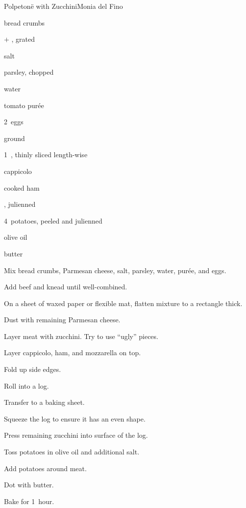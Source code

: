 \begin{recipe}{Polpeton\"e with Zucchini}{Monia del Fino}{}

\begin{ingredients}
\item {} bread crumbs
\item {}$+$ , grated
\item {} salt
\item {} parsley, chopped
\item {} water
\item {} tomato pur\'ee
\item 2~eggs
\item {} ground 
\item 1\half{}~, thinly sliced length-wise
\item cappicolo
\item cooked ham
\item {}, julienned
\item 4~potatoes, peeled and julienned
\item olive oil
\item butter
\end{ingredients}

\begin{directions}
\item Mix bread crumbs,  Parmesan cheese, salt, parsley, water, pur\'ee, and eggs.
\item Add beef and knead until well-combined.
\item On a sheet of waxed paper or flexible mat, flatten mixture to a rectangle \inch{\quarter} thick.
\item Dust with remaining Parmesan cheese.
\item Layer meat with zucchini. Try to use ``ugly'' pieces.
\item Layer cappicolo, ham, and mozzarella on top.
\item Fold up side edges.
\item Roll into a log.
\item Transfer to a baking sheet.
\item Squeeze the log to ensure it has an even shape.
\item Press remaining zucchini into surface of the log.
\item Toss potatoes in olive oil and additional salt.
\item Add potatoes around meat.
\item Dot with butter.
\item Bake for 1~hour.
\end{directions}

\end{recipe}
